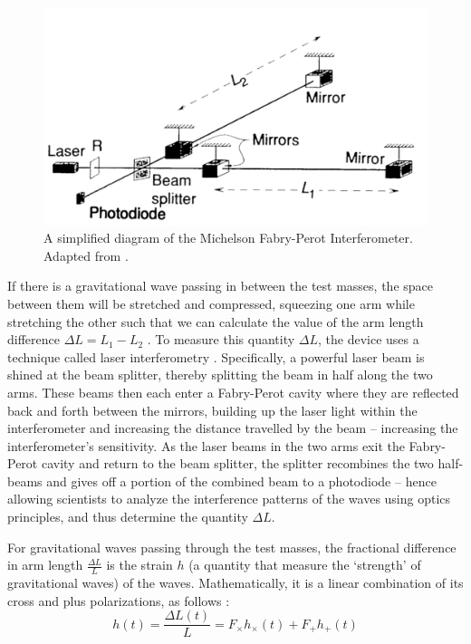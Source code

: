 \documentclass[reprint,
letterpaper,
 amsmath,amssymb,
 aps,
]{revtex4-2}
\begin{document}
\begin{figure}
\caption{A simplified diagram of the Michelson Fabry-Perot Interferometer. Adapted from \cite{JSTORLIGO}.}
\includegraphics[scale = .4]{Interferometer.png}
\centering
\end{figure} 
If there is a gravitational wave passing in between the test masses, the space between them will be stretched and compressed, squeezing one arm while stretching the other such that we can calculate the value of the arm length difference $\Delta L = L_1 - L_2$ \cite{teacherintro}. To measure this quantity $\Delta L$, the device uses a technique called laser interferometry \cite{LIGOArxiv}. Specifically, a powerful laser beam is shined at the beam splitter, thereby splitting the beam in half along the two arms. These beams then each enter a Fabry-Perot cavity where they are reflected back and forth between the mirrors, building up the laser light within the interferometer and increasing the distance travelled by the beam \cite{fabry} – increasing the interferometer's sensitivity. As the laser beams in the two arms exit the Fabry-Perot cavity and return to the beam splitter, the splitter recombines the two half-beams and gives off a portion of the combined beam to a photodiode – hence allowing scientists to analyze the interference patterns of the waves using optics principles, and thus determine the quantity $\Delta L$. 

For gravitational waves passing through the test masses, the fractional difference in arm length $\frac{\Delta L}{L}$ is the strain $h$ (a quantity that measure the `strength' of gravitational waves) of the waves. Mathematically, it is a linear combination of its cross and plus polarizations, as follows \cite{JSTORLIGO}:
\begin{equation}
h(t) = \frac{\Delta L(t)}{L} = F_\times h_\times (t) + F_+ h_+ (t)
\end{equation}
\end{document}
